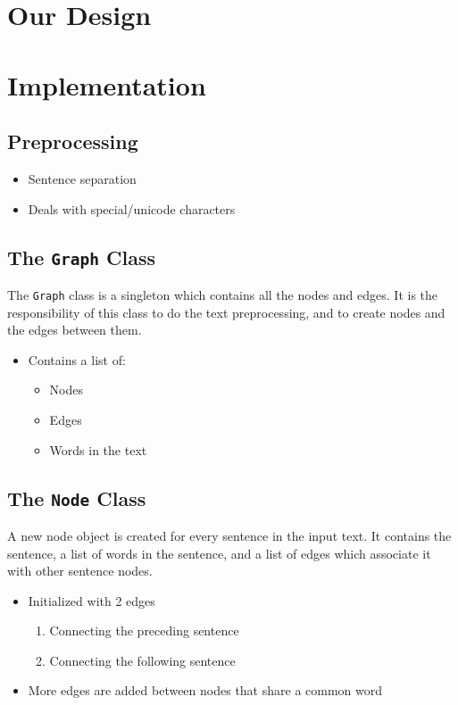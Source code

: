 \documentclass[xcolor={usenames,dvipsnames,svgnames},handouts]{beamer}
\begin{document}
\section{Our Design}

\section{Implementation}
\subsection{Preprocessing}
\begin{frame}
\begin{itemize}
	\item Sentence separation
	\item Deals with special/unicode characters
\end{itemize}
\end{frame}
\subsection{The {\tt Graph} Class}
\begin{frame}
The {\tt Graph} class is a singleton which contains all the nodes and edges. It is the responsibility of this class to do the text preprocessing, and to create nodes and the edges between them.
\begin{itemize}
	\item Contains a list of:
	\begin{itemize}
		\item Nodes
		\item Edges
		\item Words in the text
	\end{itemize}
\end{itemize}
\end{frame}
\subsection{The {\tt Node} Class}
\begin{frame}
A new node object is created for every sentence in the input text. It contains the sentence, a list of words in the sentence, and a list of edges which associate it with other sentence nodes.
\begin{itemize}
	\item Initialized with 2 edges
	\begin{enumerate}
		\item Connecting the preceding sentence
		\item Connecting the following sentence
	\end{enumerate}
	\item More edges are added between nodes that share a common word
\end{itemize}
\end{frame}
\end{document}
